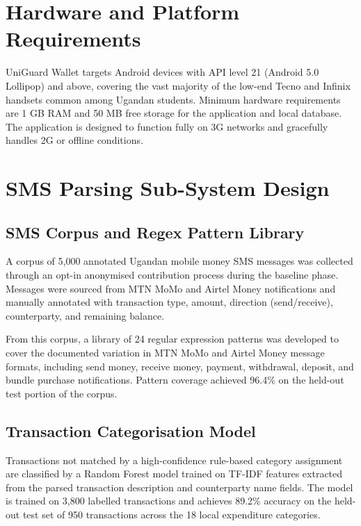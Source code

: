 \documentclass[12pt]{report}
\begin{document}
\section{Hardware and Platform Requirements}

UniGuard Wallet targets Android devices with API level 21 (Android 5.0 Lollipop) and
above, covering the vast majority of the low-end Tecno and Infinix handsets common
among Ugandan students. Minimum hardware requirements are 1 GB RAM and 50 MB
free storage for the application and local database. The application is designed to
function fully on 3G networks and gracefully handles 2G or offline conditions.

\section{SMS Parsing Sub-System Design}

\subsection{SMS Corpus and Regex Pattern Library}

A corpus of 5,000 annotated Ugandan mobile money SMS messages was collected
through an opt-in anonymised contribution process during the baseline phase. Messages
were sourced from MTN MoMo and Airtel Money notifications and manually annotated
with transaction type, amount, direction (send/receive), counterparty, and remaining
balance.

From this corpus, a library of 24 regular expression patterns was developed to cover
the documented variation in MTN MoMo and Airtel Money message formats, including
send money, receive money, payment, withdrawal, deposit, and bundle purchase
notifications. Pattern coverage achieved 96.4\% on the held-out test portion of the
corpus.

\subsection{Transaction Categorisation Model}

Transactions not matched by a high-confidence rule-based category assignment are
classified by a Random Forest model trained on TF-IDF features extracted from
the parsed transaction description and counterparty name fields. The model is trained on
3,800 labelled transactions and achieves 89.2\% accuracy on the held-out test set of 950
transactions across the 18 local expenditure categories.
\end{document}
